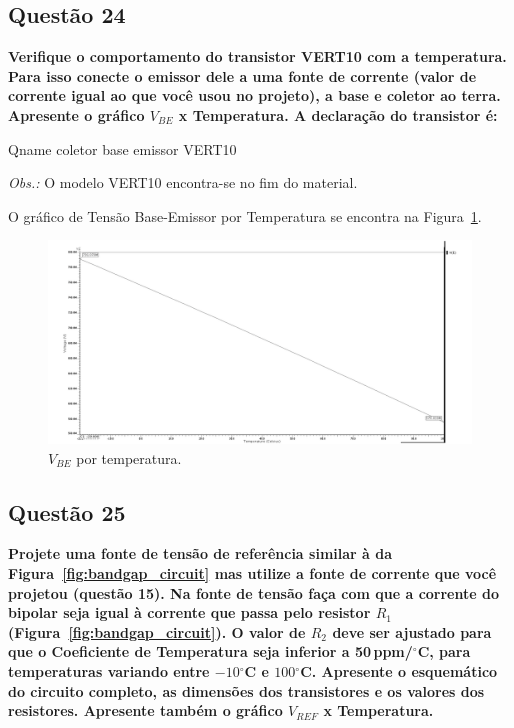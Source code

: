 \documentclass[12pt,a4paper]{article}
\newcommand{\degree}{\ensuremath{{}^\circ}}
\begin{document}
\subsection*{Questão 24}
\begin{BoxQ}
	\textbf{Verifique o comportamento do transistor VERT10 com a temperatura. Para isso conecte o emissor dele a uma fonte de corrente (valor de corrente igual ao que você usou no projeto), a base e coletor ao terra. Apresente o gráfico $V_{BE}$ x Temperatura. A declaração do transistor é:}
\begin{codeblock}[title={Declaração do transistor VERT10}]
Qname coletor base emissor VERT10
\end{codeblock}
    \textit{Obs.:} O modelo VERT10 encontra-se no fim do material.
\end{BoxQ}

O gráfico de Tensão Base-Emissor por Temperatura se encontra na Figura~\ref{fig:q24_vbe_temp}.

\begin{figure}[H]
    \centering
    \includegraphics[width=1\textwidth]{24.png}
    \caption{$V_{BE}$ por temperatura.}
    \label{fig:q24_vbe_temp}
\end{figure}

\subsection*{Questão 25}
\begin{BoxQ}
    \textbf{Projete uma fonte de tensão de referência similar à da Figura~\ref{fig:bandgap_circuit} mas utilize a fonte de corrente que você projetou (questão 15). Na fonte de tensão faça com que a corrente do bipolar seja igual à corrente que passa pelo resistor $R_1$ (Figura~\ref{fig:bandgap_circuit}). O valor de $R_2$ deve ser ajustado para que o Coeficiente de Temperatura seja inferior a 50\,ppm/\degree C, para temperaturas variando entre $-10$\degree C e $100$\degree C. Apresente o esquemático do circuito completo, as dimensões dos transistores e os valores dos resistores. Apresente também o gráfico $V_{REF}$ x Temperatura.}
\end{BoxQ}
\end{document}
